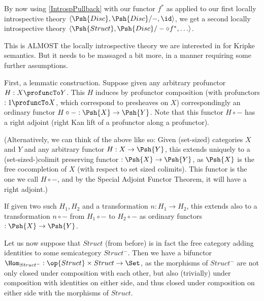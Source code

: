 By now using \cref{IntrospPullback} with our functor $f^*$ as applied to our first locally introspective theory $\langle \Psh{Disc}, \Psh{Disc}/-, \id \rangle$, we get a second locally introspective theory $\langle \Psh{Struct}, \Psh{Disc}/- \circ f^*, \ldots \rangle$.

This is ALMOST the locally introspective theory we are interested in for Kripke semantics. But it needs to be massaged a bit more, in a manner requiring some further assumptions. 

First, a lemmatic construction. Suppose given any arbitrary profunctor $H : X \profuncTo Y$. This $H$ induces by profunctor composition (with profunctors $:1 \profuncTo X$, which correspond to presheaves on $X$) correspondingly an ordinary functor $H \circ - : \Psh{X} \to \Psh{Y}$. Note that this functor $H \circ -$ has a right adjoint (right Kan lift of a profunctor along a profunctor).

(Alternatively, we can think of the above like so: Given (set-sized) categories $X$ and $Y$ and any arbitrary functor $H : X \to \Psh{Y}$, this extends uniquely to a (set-sized-)colimit preserving functor $: \Psh{X} \to \Psh{Y}$, as $\Psh{X}$ is the free cocompletion of $X$ (with respect to set sized colimits). This functor is the one we call $H \circ -$, and by the Special Adjoint Functor Theorem, it will have a right adjoint.)


If given two such $H_1, H_2$ and a transformation $n : H_1 \to H_2$, this extends also to a transformation $n \circ -$ from $H_1 \circ -$ to $H_2 \circ -$ as ordinary functors $: \Psh{X} \to \Psh{Y}$.

Let us now suppose that $Struct$ (from before) is in fact the free category adding identities to some semicategory $Struct^-$. Then we have a bifunctor $\Hom_{Struct^-} : \op{Struct} \times Struct \to \Set$, as the morphisms of $Struct^-$ are not only closed under composition with each other, but also (trivially) under composition with identities on either side, and thus closed under composition on either side with the morphisms of $Struct$. 

